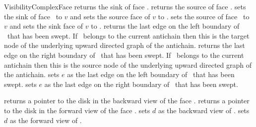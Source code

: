 \begin{ccRefConcept}{VisibilityComplexFace}
\ccTagFullDeclarations
{}
    {returns the sink of face \ccVar.}
\ccGlue
{}
    {returns the source of face \ccVar.}
\ccGlue
{}
    {sets the sink of face \ccVar\ to $v$ and sets the source face of $v$ to
    \ccVar.}
\ccGlue
{}
    {sets the source of face \ccVar\ to $v$ and sets the sink face of $v$ to
    \ccVar.}
\ccGlue
{}
    {returns the last edge on the left boundary of \ccVar\ that has been swept.
    If \ccVar\ belongs to the current antichain then this is the target node of the
    underlying upward directed graph of the antichain. }
\ccGlue
{}
    {returns the last edge on the right boundary of \ccVar\ that has been swept. 
    If \ccVar\ belongs to the current antichain then this is the source node of the
    underlying upward directed graph of the antichain. }
\ccGlue
{}
    {sets $e$ as the last edge on the left boundary of \ccVar\ that has been
    swept.}
\ccGlue
{}
    {sets $e$ as the last edge on the right boundary of \ccVar\ that has been
    swept.}

{returns a pointer to the disk in the backward view of the face \ccVar.}
\ccGlue
{}
{returns a pointer to the disk in the forward view of the face \ccVar.}
    {sets $d$ as the backward view of \ccVar.}
\ccGlue
{}
    {sets $d$ as the forward view of \ccVar.}
\ccTagDefaults

\ccHasModels


\ccSeeAlso

 \\
\\
\\

\ccTagDefaults
\end{ccRefConcept}
\ccRefPageEnd
